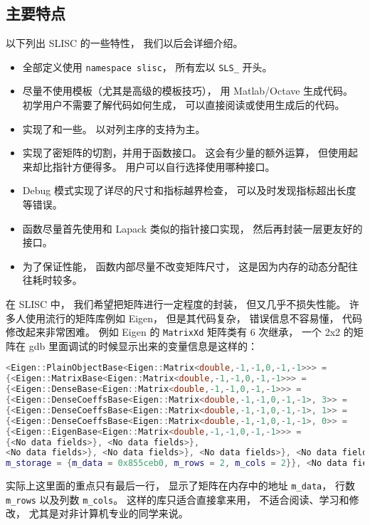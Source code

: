 \subsection{主要特点}
以下列出 SLISC 的一些特性， 我们以后会详细介绍。
\begin{itemize}
\item 全部定义使用 \verb`namespace slisc`， 所有宏以 \verb`SLS_` 开头。
\item 尽量不使用模板（尤其是高级的模板技巧）， 用 Matlab/Octave 生成代码。 初学用户不需要了解代码如何生成， 可以直接阅读或使用生成后的代码。
\item 实现了和一些。 以对列主序的支持为主。
\item 实现了密矩阵的切割，并用于函数接口。 这会有少量的额外运算， 但使用起来却比指针方便得多。 用户可以自行选择使用哪种接口。
\item Debug 模式实现了详尽的尺寸和指标越界检查， 可以及时发现指标超出长度等错误。
\item 函数尽量首先使用和 Lapack 类似的指针接口实现， 然后再封装一层更友好的接口。
\item 为了保证性能， 函数内部尽量不改变矩阵尺寸， 这是因为内存的动态分配往往耗时较多。
\end{itemize}

在 SLISC 中， 我们希望把矩阵进行一定程度的封装， 但又几乎不损失性能。 许多人使用流行的矩阵库例如 Eigen， 但是其代码复杂， 错误信息不容易懂， 代码修改起来非常困难。 例如 Eigen 的 \verb`MatrixXd` 矩阵类有 6 次继承， 一个 2x2 的矩阵在 gdb 里面调试的时候显示出来的变量信息是这样的：
\begin{lstlisting}[language=cpp]
<Eigen::PlainObjectBase<Eigen::Matrix<double,-1,-1,0,-1,-1>>> = 
{<Eigen::MatrixBase<Eigen::Matrix<double,-1,-1,0,-1,-1>>> = 
{<Eigen::DenseBase<Eigen::Matrix<double,-1,-1,0,-1,-1>>> = 
{<Eigen::DenseCoeffsBase<Eigen::Matrix<double,-1,-1,0,-1,-1>, 3>> = 
{<Eigen::DenseCoeffsBase<Eigen::Matrix<double,-1,-1,0,-1,-1>, 1>> = 
{<Eigen::DenseCoeffsBase<Eigen::Matrix<double,-1,-1,0,-1,-1>, 0>> = 
{<Eigen::EigenBase<Eigen::Matrix<double,-1,-1,0,-1,-1>>> =
{<No data fields>}, <No data fields>}, 
<No data fields>}, <No data fields>}, <No data fields>}, <No data fields>},
m_storage = {m_data = 0x855ceb0, m_rows = 2, m_cols = 2}}, <No data fields>
\end{lstlisting}
实际上这里面的重点只有最后一行， 显示了矩阵在内存中的地址 \verb`m_data`， 行数 \verb`m_rows` 以及列数 \verb`m_cols`。 这样的库只适合直接拿来用， 不适合阅读、学习和修改， 尤其是对非计算机专业的同学来说。

